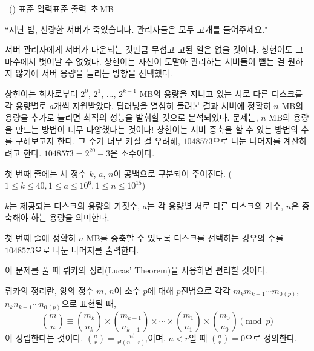 \begin{problem}{\kcpcprobserver\ (\kcpcprobservershort)}
    {표준 입력}{표준 출력}
    {\kcpcprobservertime\,초}{\kcpcprobservermemory\,MB}{}
    
    ``지난 밤, 선량한 서버가 죽었습니다. 관리자들은 모두 고개를 들어주세요."
    
    서버 관리자에게 서버가 다운되는 것만큼 무섭고 고된 일은 없을 것이다. 상헌이도 그 마수에서 벗어날 수 없었다. 상헌이는 자신이 도맡아 관리하는 서버들이 뻗는 걸 원하지 않기에 서버 용량을 늘리는 방향을 선택했다.
    
    상헌이는 회사로부터 $2^0$, $2^1$, ..., $2^{k-1}$ MB의 용량을 지니고 있는 서로 다른 디스크를 각 용량별로 $a$개씩 지원받았다. 딥러닝을 열심히 돌려본 결과 서버에 정확히 $n$ MB의 용량을 추가로 늘리면 최적의 성능을 발휘할 것으로 분석되었다. 문제는, $n$ MB의 용량을 만드는 방법이 너무 다양했다는 것이다! 상헌이는 서버 증축을 할 수 있는 방법의 수를 구해보고자 한다. 그 수가 너무 커질 걸 우려해, $1048573$으로 나눈 나머지를 계산하려고 한다. 
    $1048573 = 2^{20} - 3$은 소수이다.
    
    \InputFile
    첫 번째 줄에는 세 정수 $k$, $a$, $n$이 공백으로 구분되어 주어진다. ($1 \leq k \leq 40, 1 \leq a \leq 10^6, 1 \leq n \leq 10^{15}$)
    
    $k$는 제공되는 디스크의 용량의 가짓수, $a$는 각 용량별 서로 다른 디스크의 개수, $n$은 증축해야 하는 용량을 의미한다.
    
    \OutputFile
    첫 번째 줄에 정확히 $n$ MB를 증축할 수 있도록 디스크를 선택하는 경우의 수를 $1048573$으로 나눈 나머지를 출력한다.
    
    \Examples
    \begin{example}
    \end{example}
    
    \Note
    이 문제를 풀 때 뤼카의 정리(Lucas' Theorem)을 사용하면 편리할 것이다. 
    
    뤼카의 정리란, 양의 정수 $m$, $n$이 소수 $p$에 대해 $p$진법으로 각각 $m_{k}m_{k-1}\cdots m_{0}{_{(p)}}$, $n_{k}n_{k-1}\cdots n_{0}{_{(p)}}$으로 표현될 때,
    $$
    \binom{m}{n} \equiv \binom{m_k}{n_k} \times \binom{m_{k-1}}{n_{k-1}} \times \cdots \times \binom{m_1}{n_1} \times \binom{m_0}{n_0} \pmod p
    $$
    이 성립한다는 것이다. $\binom{n}{r} = \frac{n!}{r!(n-r)!}$이며, $n < r$일 때 $\binom{n}{r} = 0$으로 정의한다.
    
\end{problem}

